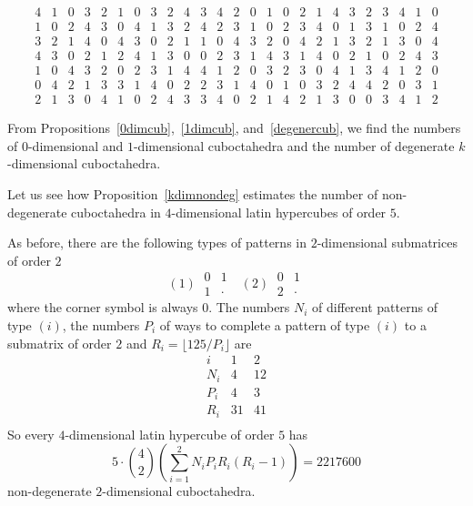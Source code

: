 \documentclass[a4paper]{article}
\begin{document}
$$\begin{array}{ccccc|ccccc|ccccc|ccccc|ccccc}
4 & 1 & 0 & 3 & 2 & 1 & 0 & 3 & 2 & 4 & 3 & 4 & 2 & 0 & 1 & 0 & 2 & 1 & 4 & 3 & 2 & 3 & 4 & 1 & 0 \\ 
1 & 0 & 2 & 4 & 3 & 0 & 4 & 1 & 3 & 2 & 4 & 2 & 3 & 1 & 0 & 2 & 3 & 4 & 0 & 1 & 3 & 1 & 0 & 2 & 4 \\ 
\hline
3 & 2 & 1 & 4 & 0 & 4 & 3 & 0 & 2 & 1 & 1 & 0 & 4 & 3 & 2 & 0 & 4 & 2 & 1 & 3 & 2 & 1 & 3 & 0 & 4 \\ 
4 & 3 & 0 & 2 & 1 & 2 & 4 & 1 & 3 & 0 & 0 & 2 & 3 & 1 & 4 & 3 & 1 & 4 & 0 & 2 & 1 & 0 & 2 & 4 & 3 \\ 
1 & 0 & 4 & 3 & 2 & 0 & 2 & 3 & 1 & 4 & 4 & 1 & 2 & 0 & 3 & 2 & 3 & 0 & 4 & 1 & 3 & 4 & 1 & 2 & 0 \\ 
0 & 4 & 2 & 1 & 3 & 3 & 1 & 4 & 0 & 2 & 2 & 3 & 1 & 4 & 0 & 1 & 0 & 3 & 2 & 4 & 4 & 2 & 0 & 3 & 1 \\ 
2 & 1 & 3 & 0 & 4 & 1 & 0 & 2 & 4 & 3 & 3 & 4 & 0 & 2 & 1 & 4 & 2 & 1 & 3 & 0 & 0 & 3 & 4 & 1 & 2
\end{array}
$$


From Propositions~\ref{0dimcub},~\ref{1dimcub}, and~\ref{degenercub},  we find the numbers of  $0$-dimensional and $1$-dimensional cuboctahedra  and  the number of degenerate $k$-dimensional cuboctahedra.

Let us see how  Proposition~\ref{kdimnondeg} estimates the number of non-degenerate cuboctahedra in $4$-dimensional latin hypercubes of order $5$. 

As before, there are the  following types of patterns in $2$-dimensional  submatrices of order $2$ 
$$
(1) ~\begin{array}{cc}
0 & 1 \\ 1 & \cdot
\end{array} ~~~
(2) ~ \begin{array}{cc}
0 & 1 \\ 2 & \cdot
\end{array}
$$
 where the corner symbol is always $0$. The numbers   $N_i$ of  different patterns of type $(i)$,   the numbers $P_i$  of ways to complete a pattern of type   $(i)$ to a  submatrix of order $2$  and   $R_i = \lfloor 125  / P_i  \rfloor$ are
$$
\begin{array}{c||c|c}
i & 1 & 2 \\
\hline
N_i & 4  & 12  \\
P_i & 4  & 3 \\
R_i & 31 &  41 \\
\end{array}
$$
So every $4$-dimensional latin hypercube of order $5$ has 
$$  5 \cdot  {4 \choose 2}  \left( \sum\limits_{i=1}^2 N_i P_i R_i(R_i - 1)  \right)   = 2217600  $$  
non-degenerate $2$-dimensional cuboctahedra. 
\end{document}
